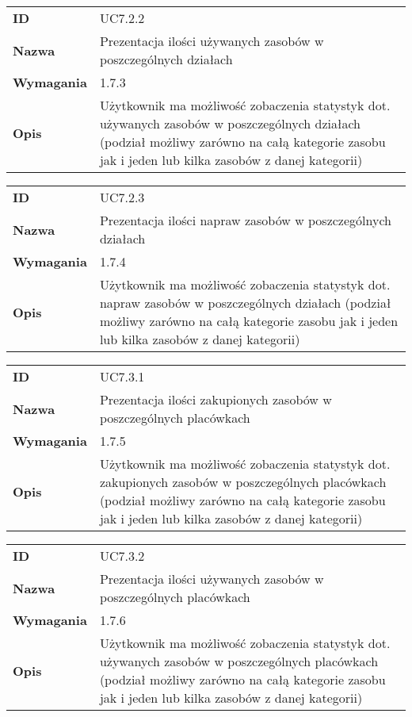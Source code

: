 \vspace{.05\textheight}

\begin{tabular}{p{}p{}}
\hfill {\bf ID} & UC7.2.2 \\
\hfill {\bf Nazwa} & Prezentacja ilości używanych zasobów w poszczególnych działach \\
\hfill {\bf Wymagania} & 1.7.3 \\
\hfill {\bf Opis} & Użytkownik ma możliwość zobaczenia statystyk dot. używanych zasobów w poszczególnych działach (podział możliwy zarówno na całą kategorie zasobu jak i jeden lub kilka zasobów z danej kategorii) \\
\end{tabular}

\vspace{.05\textheight}

\begin{tabular}{p{}p{}}
\hfill {\bf ID} & UC7.2.3 \\
\hfill {\bf Nazwa} &  Prezentacja ilości napraw zasobów w poszczególnych działach \\
\hfill {\bf Wymagania} & 1.7.4 \\
\hfill {\bf Opis} &  Użytkownik ma możliwość zobaczenia statystyk dot. napraw zasobów w poszczególnych działach (podział możliwy zarówno na całą kategorie zasobu jak i jeden lub kilka zasobów z danej kategorii) \\
\end{tabular}

\vspace{.05\textheight}

\begin{tabular}{p{}p{}}
\hfill {\bf ID} & UC7.3.1 \\
\hfill {\bf Nazwa} & Prezentacja ilości zakupionych zasobów w poszczególnych placówkach \\
\hfill {\bf Wymagania} & 1.7.5 \\
\hfill {\bf Opis} & Użytkownik ma możliwość zobaczenia statystyk dot. zakupionych zasobów w poszczególnych placówkach (podział możliwy zarówno na całą kategorie zasobu jak i jeden lub kilka zasobów z danej kategorii) \\
\end{tabular}

\vspace{.05\textheight}

\begin{tabular}{p{}p{}}
\hfill {\bf ID} & UC7.3.2 \\
\hfill {\bf Nazwa} &  Prezentacja ilości używanych zasobów w poszczególnych placówkach \\
\hfill {\bf Wymagania} & 1.7.6  \\
\hfill {\bf Opis} &  Użytkownik ma możliwość zobaczenia statystyk dot. używanych zasobów w poszczególnych placówkach (podział możliwy zarówno na całą kategorie zasobu jak i jeden lub kilka zasobów z danej kategorii) \\
\end{tabular}

